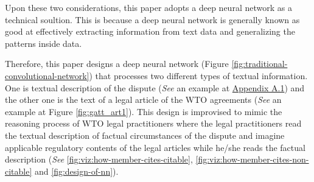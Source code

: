 Upon these two considerations, this paper adopts a deep neural network as a technical soultion. %
This is because a deep neural network is generally known as good at effectively extracting information from text data and generalizing the patterns inside data. 


Therefore, this paper designs a deep neural network (Figure \ref{fig:traditional-convolutional-network}) that
processes two different types of textual information.
One is textual description of the dispute (\textit{See} an example at \hyperref[sub:factual-aspect-example]{Appendix A.1}) and
the other one is the text of a legal article of the WTO agreements (\textit{See} an example at Figure \ref{fig:gatt_art1}).
This design is improvised to mimic
the reasoning process of WTO legal practitioners
where the legal practitioners read
the textual description of
factual circumstances of the dispute and imagine applicable regulatory contents of
the legal articles while he/she reads the factual description (\textit{See} \ref{fig:viz:how-member-cites-citable}, \ref{fig:viz:how-member-cites-non-citable} and \ref{fig:design-of-nn}).






